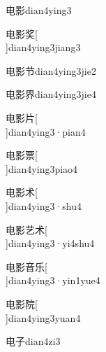 \begin{verbete}[5;15]{电影}{dian4ying3}
\end{verbete}

\begin{verbete}[5;15;9]{电影奖}[\\]{dian4ying3jiang3}
\end{verbete}

\begin{verbete}[5;15;5]{电影节}{dian4ying3jie2}
\end{verbete}

\begin{verbete}[5;15;9]{电影界}{dian4ying3jie4}
\end{verbete}

\begin{verbete}[5;15;4]{电影片}[\\]{dian4ying3·pian4}
\end{verbete}

\begin{verbete}[5;15;11]{电影票}[\\]{dian4ying3piao4}
\end{verbete}

\begin{verbete}[5;15;5]{电影术}[\\]{dian4ying3·shu4}
\end{verbete}

\begin{verbete}[5;15;4;5]{电影艺术}[\\]{dian4ying3·yi4shu4}
\end{verbete}

\begin{verbete}[5;15;9;5]{电影音乐}[\\]{dian4ying3·yin1yue4}
\end{verbete}

\begin{verbete}[5;15;10]{电影院}[\\]{dian4ying3yuan4}
\end{verbete}

\begin{verbete}[5;3]{电子}{dian4zi3}
\end{verbete}


